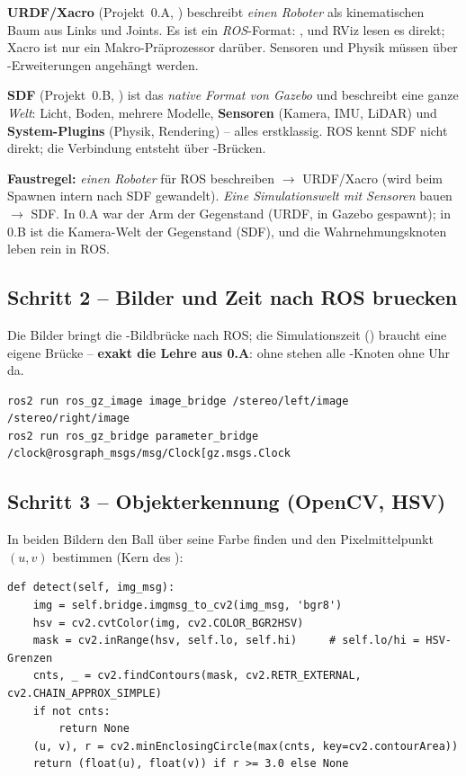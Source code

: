 \begin{infobox}[title={SDF (0.B) vs.\ URDF/Xacro (0.A) -- der Unterschied}]
\textbf{URDF/Xacro} (Projekt~0.A, ) beschreibt \emph{einen
Roboter} als kinematischen Baum aus Links und Joints. Es ist ein \emph{ROS}-Format:
,  und RViz lesen es direkt;
Xacro ist nur ein Makro-Präprozessor darüber. Sensoren und Physik müssen über
-Erweiterungen angehängt werden.

\textbf{SDF} (Projekt~0.B, ) ist das \emph{native Format von
Gazebo} und beschreibt eine ganze \emph{Welt}: Licht, Boden, mehrere Modelle,
\textbf{Sensoren} (Kamera, IMU, LiDAR) und \textbf{System-Plugins} (Physik,
Rendering) -- alles erstklassig. ROS kennt SDF nicht direkt; die Verbindung
entsteht über -Brücken.

\textbf{Faustregel:} \emph{einen Roboter} für ROS beschreiben $\rightarrow$
URDF/Xacro (wird beim Spawnen intern nach SDF gewandelt). \emph{Eine
Simulationswelt mit Sensoren} bauen $\rightarrow$ SDF. In 0.A war der Arm der
Gegenstand (URDF, in Gazebo gespawnt); in 0.B ist die Kamera-Welt der Gegenstand
(SDF), und die Wahrnehmungsknoten leben rein in ROS.
\end{infobox}

\subsection{Schritt 2 -- Bilder und Zeit nach ROS bruecken}
Die Bilder bringt die -Bildbrücke nach ROS; die Simulationszeit
() braucht eine eigene Brücke -- \textbf{exakt die Lehre aus 0.A}:
ohne  stehen alle -Knoten ohne Uhr da.
\begin{lstlisting}[style=bash,caption={Brücken (in der Launch-Datei aus Schritt 6 gebündelt)}]
ros2 run ros_gz_image image_bridge /stereo/left/image /stereo/right/image
ros2 run ros_gz_bridge parameter_bridge /clock@rosgraph_msgs/msg/Clock[gz.msgs.Clock
\end{lstlisting}

\subsection{Schritt 3 -- Objekterkennung (OpenCV, HSV)}
In beiden Bildern den Ball über seine Farbe finden und den Pixelmittelpunkt
$(u,v)$ bestimmen (Kern des ):
\begin{lstlisting}[style=py,caption={HSV-Erkennung (Methode \code{detect})}]
def detect(self, img_msg):
    img = self.bridge.imgmsg_to_cv2(img_msg, 'bgr8')
    hsv = cv2.cvtColor(img, cv2.COLOR_BGR2HSV)
    mask = cv2.inRange(hsv, self.lo, self.hi)     # self.lo/hi = HSV-Grenzen
    cnts, _ = cv2.findContours(mask, cv2.RETR_EXTERNAL, cv2.CHAIN_APPROX_SIMPLE)
    if not cnts:
        return None
    (u, v), r = cv2.minEnclosingCircle(max(cnts, key=cv2.contourArea))
    return (float(u), float(v)) if r >= 3.0 else None
\end{lstlisting}

